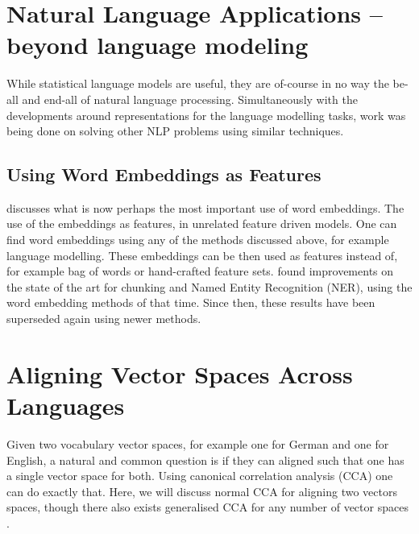 \documentclass[parskip]{komatufte}
\begin{document}
\section{Natural Language Applications -- beyond language modeling}
While statistical language models are useful, they are of-course in no way the be-all and end-all of natural language processing.
Simultaneously with the developments around representations for the language modelling tasks, work was being done on solving other NLP problems using similar techniques.



\subsection{Using Word Embeddings as Features}


 discusses what is now perhaps the most important use of word embeddings.
The use of the embeddings as features, in unrelated feature driven models.
One can find word embeddings using any of the methods discussed above, for example language modelling.
These embeddings can be then used as features instead of, for example bag of words or hand-crafted feature sets.
 found improvements on the state of the art for chunking and Named Entity Recognition (NER), using the word embedding methods of that time.
Since then, these results have been superseded again using newer methods.



\section{Aligning Vector Spaces Across Languages}
Given two vocabulary vector spaces, for example one for German and one for English,
a natural and common question is if they can aligned such that one has a single vector space for both.
Using canonical correlation analysis (CCA) one can do exactly that.
Here, we will discuss normal CCA for aligning two vectors spaces,
though there also exists generalised CCA for any number of vector spaces .
\end{document}
